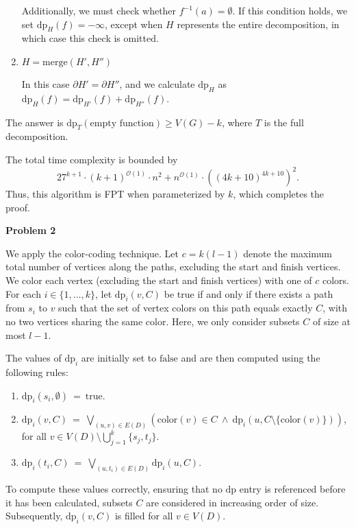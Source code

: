 \documentclass[12pt]{article}
\begin{document}
\begin{enumerate}
		      Additionally, we must check whether \(f^{-1}(a) = \emptyset\). If
		      this condition holds, we set \(\text{dp}_{H}(f) = -\infty\),
		      except when \(H\) represents the entire decomposition, in which
		      case this check is omitted.
		
		\item \(H = \text{merge}(H', H'')\)
		      
		      In this case \(\partial H' = \partial H''\), and we calculate
		      \(\text{dp}_{H}\) as \(\text{dp}_{H}(f) = \text{dp}_{H'}(f) +
		      \text{dp}_{H''}(f)\).
	\end{enumerate}
	The answer is \(\text{dp}_{T}(\text{empty function}) \geqslant V(G) - k\),
	where \(T\) is the full decomposition.
	
	\medskip
	
	The total time complexity is bounded by
	\[ 27^{k + 1} \cdot (k + 1)^{\mathcal{O}(1)} \cdot n^{2} +
	n^{\mathcal{O}(1)} \cdot \left( (4k + 10)^{4k + 10} \right)^{2} \text{.} \]
	Thus, this algorithm is FPT when parameterized by \(k\), which completes the
	proof.
	
	\bigskip
	
	\textbf{Problem 2}
	
	\medskip
	
	We apply the color-coding technique. Let \(c = k(l - 1)\) denote the
	maximum total number of vertices along the paths, excluding the start and
	finish vertices. We color each vertex (excluding the start and finish
	vertices) with one of \(c\) colors. For each \(i \in \{1, \ldots, k\}\), let
	\(\text{dp}_{i}(v, C)\) be true if and only if there exists a path from
	\(s_{i}\) to \(v\) such that the set of vertex colors on this path equals
	exactly \(C\), with no two vertices sharing the same color. Here, we only
	consider subsets \(C\) of size at most \(l - 1\).
	
	\medskip
	
	The values of \(\text{dp}_{i}\) are initially set to \(\text{false}\) and
	are then computed using the following rules:
	\begin{enumerate}
		\item \(\text{dp}_{i}(s_{i}, \emptyset) \ = \ \text{true}\).
		\item \(\text{dp}_{i}(v, C) \ = \ \bigvee\limits_{(u, v) \in E(D)}
		      (\text{color}(v) \in C \ \wedge \ \text{dp}_{i}(u, C \setminus
		      \{\text{color}(v)\}))\), for all \(v \in V(D) \setminus
		      \bigcup\limits_{j = 1}^{k} \{s_{j}, t_{j}\}\).
		\item \(\text{dp}_{i}(t_{i}, C) \ = \ \bigvee\limits_{(u, t_{i}) \in
		      E(D)} \text{dp}_{i}(u, C)\).
	\end{enumerate}
	To compute these values correctly, ensuring that no \(\text{dp}\) entry is
	referenced before it has been calculated, subsets \(C\) are considered in
	increasing order of size. Subsequently, \(\text{dp}_{i}(v, C)\) is filled
	for all \(v \in V(D)\).
	
\end{document}
